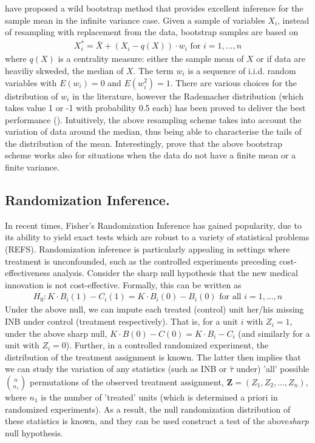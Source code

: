 \documentclass[english, 11pt,a4paper, ]{article}
\begin{document}
\cite{cavaliere2013econometricreviews} have proposed a wild bootstrap method that provides excellent inference for the sample mean in the infinite variance case. Given a sample of variables $X_i$, instead of resampling with replacement from the data, bootstrap samples are based on 
\begin{align} 
X_i^* = \bar{X} + (X_i - q(X))\cdot w_i \text{ for }i=1,...,n
\end{align}
where $q(X)$ is a centrality measure: either the sample mean of $X$ or if data are heaviliy skweded, the median of $X$. The term $w_i$ is a sequence of i.i.d. random variables with $E(w_i)=0$ and $E(w_i^2)=1$. There are various choices for the distribution of $w_i$ in the literature, however the Rademacher distribution (which takes value 1 or -1 with probability 0.5 each) has been proved to deliver the best performance (\citealp{davidsonFlachaire2008joe}). Intuitively, the above resampling scheme takes into account the variation of data around the median, thus being able to characterise the tails of the distribution of the mean. Interestingly, \cite{cavaliere2013econometricreviews} prove that the above bootstrap scheme works also for situations when the data do not have a finite mean or a finite variance.                                            

\subsection{Randomization Inference.}

 In recent times, Fisher's Randomization Inference has gained popularity, due to its ability to yield exact tests which are robust to a variety of statistical problems (REFS). Randomization inference is particularly appealing in settings where treatment is unconfounded, such as the controlled experiments preceding cost-effectiveness analysis. 
 Consider the sharp null hypothesis that the new medical innovation is not cost-effective. Formally, this can be written as 
 \begin{align}
	H_0: K\cdot B_i(1) - C_i(1) = K\cdot B_i(0)-B_i(0) \text{ for all }i=1,...,n
 \end{align}
 Under the above null, we can impute each treated (control) unit her/his missing INB under control (treatment respectively). That is, for a unit $i$ with $Z_i=1$, under the above sharp null, $K\cdot B(0)-C(0)=K\cdot B_i -C_i$ (and similarly for a unit with $Z_i=0$). Further, in a controlled randomized experiment, the distribution of the treatment assignment is known. The latter then implies that we can study the variation of any statistics (such as INB or $\hat{\tau}$ under) 'all' possible  $\binom{n}{n_1}$ permutations of the observed treatment assignment, $\mathbf{Z}=(Z_1,Z_2,...,Z_n)$, where $n_1$ is the number of 'treated' units (which is determined a priori in randomized experiments). As a result, the null randomization distribution of these statistics is known, and they can be used construct a test of the above\textit{sharp} null hypothesis.
 
\end{document}

